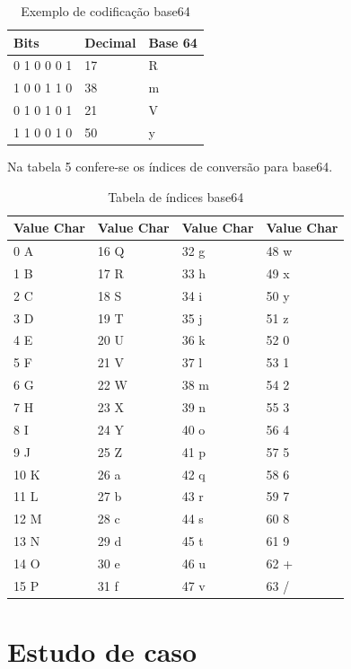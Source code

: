 \documentclass[12pt]{article}
\begin{document}
\begin{table}[ht]
	\centering
	\caption{Exemplo de codificação base64}
	\label{tab:Table4}
	\smallskip
	\begin{tabular}{ |l|l|l| }
		\hline
		Bits & Decimal & Base 64\\ \hline
		0 1 0 0 0 1 & 17 & R \\ \hline
		1 0 0 1 1 0 & 38 & m \\ \hline
		0 1 0 1 0 1 & 21 & V \\ \hline
		1 1 0 0 1 0 & 50 & y \\ \hline
	\end{tabular}
\end{table}

Na tabela 5 confere-se os índices de conversão para base64.

\begin{table}[ht]
	\centering
	\caption{Tabela de índices base64}
	\label{tab:Table5}
	\smallskip
	\begin{tabular}{ |l|l|l|l| }
		\hline
		Value Char&Value Char&Value Char&Value Char \\ \hline
		0	A&	16	Q&	32	g&	48	w \\ \hline
		1	B&	17	R&	33	h&	49	x \\ \hline
		2	C&	18	S&	34	i&	50	y \\ \hline
		3	D&	19	T&	35	j&	51	z \\ \hline
		4	E&	20	U&	36	k&	52	0 \\ \hline
		5	F&	21	V&	37	l&	53	1 \\ \hline
		6	G&	22	W&	38	m&	54	2 \\ \hline
		7	H&	23	X&	39	n&	55	3 \\ \hline
		8	I&	24	Y&	40	o&	56	4 \\ \hline
		9	J&	25	Z&	41	p&	57	5 \\ \hline
		10	K&	26	a&	42	q&	58	6 \\ \hline
		11	L&	27	b&	43	r&	59	7 \\ \hline
		12	M&	28	c&	44	s&	60	8 \\ \hline
		13	N&	29	d&	45	t&	61	9 \\ \hline
		14	O&	30	e&	46	u&	62	+ \\ \hline
		15	P&	31	f&	47	v&	63	/ \\ \hline
	\end{tabular}
\end{table}

\section{Estudo de caso}
\end{document}

